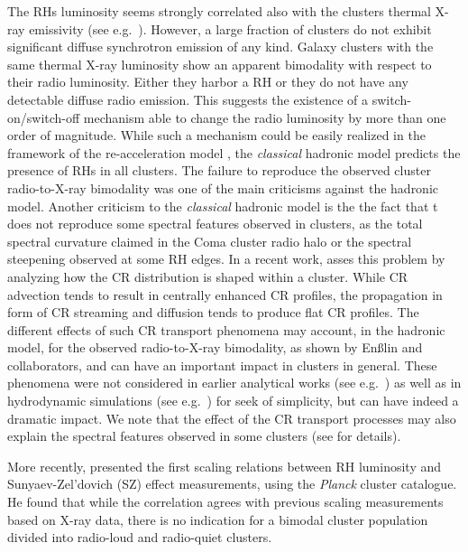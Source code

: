 \documentclass[traditabstract]{aa}
\begin{document}
The RHs luminosity seems strongly correlated also with the clusters thermal X-ray emissivity (see e.g.~\citealp{2009A&A...507..661B,2011A&A...527A..99E}).
However, a large fraction of clusters do not exhibit significant diffuse synchrotron emission of any kind. Galaxy clusters with the same thermal X-ray luminosity show
an apparent bimodality with respect to their radio luminosity. Either they harbor a RH or they do not have any detectable diffuse radio emission. 
This suggests the existence of a switch-on/switch-off mechanism able to change the radio luminosity by more than one order of magnitude.
While such a mechanism could be easily realized in the framework of the re-acceleration model \citep{2009A&A...507..661B}, the \emph{classical} 
hadronic model predicts the presence of RHs in all clusters. The failure to reproduce the observed cluster radio-to-X-ray bimodality was one of
the main criticisms against the hadronic model. Another criticism to the \emph{classical} hadronic model is the the fact that t does not reproduce 
some spectral features observed in clusters, as the total spectral curvature claimed in the Coma cluster radio halo or the spectral steepening observed at 
some RH edges. In a recent work, \cite{2011A&A...527A..99E} asses this problem by analyzing how the CR distribution is shaped within a cluster. While 
CR advection tends to result in centrally enhanced CR profiles, the propagation in form of CR streaming and diffusion tends to produce flat CR profiles. 
The different  effects of such CR transport phenomena may account, in the hadronic model, for the observed radio-to-X-ray bimodality, as shown by En{\ss}lin and 
collaborators, and can have an important impact in clusters in general. These phenomena were not considered in earlier analytical works (see 
e.g.~\citealp{2004A&A...413...17P,2004MNRAS.352...76P}) as well as in hydrodynamic simulations (see e.g.~\citealp{2008MNRAS.385.1211P,
2010MNRAS.409..449P}) for seek of simplicity, but can have indeed a dramatic impact.  We note that the effect of the CR transport processes 
may also explain the spectral features observed in some clusters (see \citealp{2011A&A...527A..99E} for details).

More recently, \cite{2012MNRAS.421L.112B} presented the first scaling relations between RH luminosity and Sunyaev-Zel'dovich (SZ) effect measurements,
using the \emph{Planck} cluster catalogue. He found that while the correlation agrees with previous scaling measurements based on X-ray data, there is no indication
for a bimodal cluster population divided into radio-loud and radio-quiet clusters.
 
\end{document}
